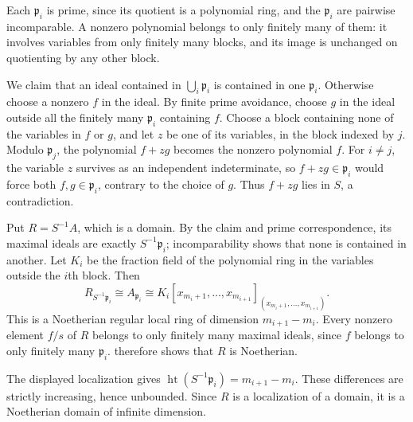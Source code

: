 Each $\mathfrak p_i$ is prime, since its quotient is a polynomial ring, and the $\mathfrak p_i$ are pairwise incomparable. A nonzero polynomial belongs to only finitely many of them: it involves variables from only finitely many blocks, and its image is unchanged on quotienting by any other block.

We claim that an ideal contained in $\bigcup_i\mathfrak p_i$ is contained in one $\mathfrak p_i$. Otherwise choose a nonzero $f$ in the ideal. By finite prime avoidance, choose $g$ in the ideal outside all the finitely many $\mathfrak p_i$ containing $f$. Choose a block containing none of the variables in $f$ or $g$, and let $z$ be one of its variables, in the block indexed by $j$. Modulo $\mathfrak p_j$, the polynomial $f+zg$ becomes the nonzero polynomial $f$. For $i\neq j$, the variable $z$ survives as an independent indeterminate, so $f+zg\in\mathfrak p_i$ would force both $f,g\in\mathfrak p_i$, contrary to the choice of $g$. Thus $f+zg$ lies in $S$, a contradiction.

Put $R=S^{-1}A$, which is a domain. By the claim and prime correspondence, its maximal ideals are exactly $S^{-1}\mathfrak p_i$; incomparability shows that none is contained in another. Let $K_i$ be the fraction field of the polynomial ring in the variables outside the $i$th block. Then
\[R_{S^{-1}\mathfrak p_i}\cong A_{\mathfrak p_i}\cong K_i[x_{m_i+1},\ldots,x_{m_{i+1}}]_{(x_{m_i+1},\ldots,x_{m_{i+1}})}.\]
This is a Noetherian regular local ring of dimension $m_{i+1}-m_i$. Every nonzero element $f/s$ of $R$ belongs to only finitely many maximal ideals, since $f$ belongs to only finitely many $\mathfrak p_i$.  therefore shows that $R$ is Noetherian.

The displayed localization gives $\operatorname{ht}(S^{-1}\mathfrak p_i)=m_{i+1}-m_i$. These differences are strictly increasing, hence unbounded. Since $R$ is a localization of a domain, it is a Noetherian domain of infinite dimension.
